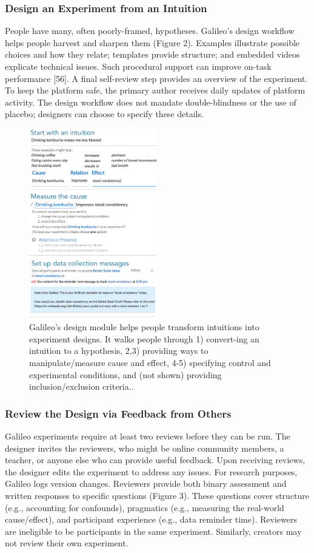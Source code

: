 \subsubsection{Design an Experiment from an Intuition}
People have many, often poorly-framed, hypotheses. Galileo’s design workflow helps people harvest and sharpen them (Figure 2). Examples illustrate possible choices and how they relate; templates provide structure; and embedded videos explicate technical issues. Such procedural support can improve on-task performance [56]. A final self-review step provides an overview of the experiment. To keep the platform safe, the primary author receives daily updates of platform activity. The design workflow does not mandate double-blindness or the use of placebo; designers can choose to specify these details.

\begin{figure}[h] 
  \centering
  \includegraphics[width=0.5\textwidth]{figures/galileo/galileo-2-design}
  \caption[]
{Galileo’s design module helps people transform intuitions into experiment designs. It walks people through 1) convert-ing an intuition to a hypothesis, 2,3) providing ways to manipulate/measure cause and effect, 4-5) specifying control and experimental conditions, and (not shown) providing inclusion/exclusion criteria..}
  \label{fig:galileo-2}
\end{figure}

\subsubsection{Review the Design via Feedback from Others}
Galileo experiments require at least two reviews before they can be run. The designer invites the reviewers, who might be online community members, a teacher, or anyone else who can provide useful feedback. Upon receiving reviews, the designer edits the experiment to address any issues. For research purposes, Galileo logs version changes. Reviewers provide both binary assessment and written responses to specific questions (Figure 3). These questions cover structure (e.g., accounting for confounds), pragmatics (e.g., measuring the real-world cause/effect), and participant experience (e.g., data reminder time). Reviewers are ineligible to be participants in the same experiment. Similarly, creators may not review their own experiment. 

